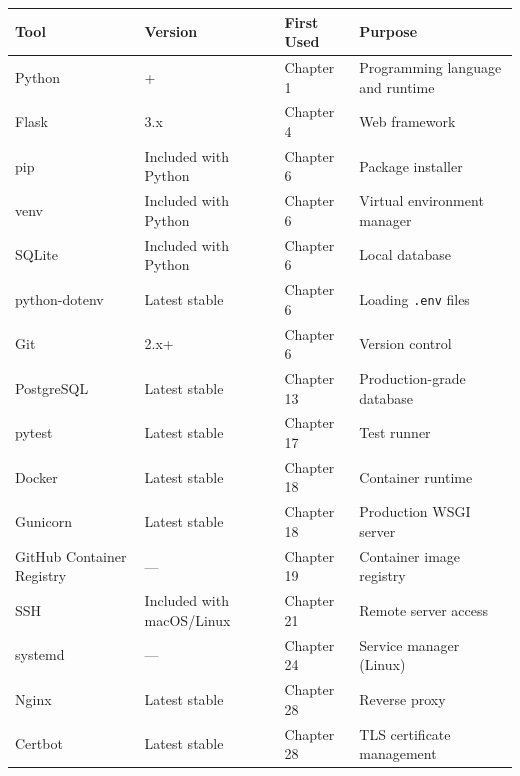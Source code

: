 {\def\LTcaptype{none} %
\begin{longtable}[]{@{}
  >{\raggedright\arraybackslash}p{}
  >{\raggedright\arraybackslash}p{}
  >{\raggedright\arraybackslash}p{}
  >{\raggedright\arraybackslash}p{}@{}}
\toprule\noalign{}
\begin{minipage}[b]{\linewidth}\raggedright
Tool
\end{minipage} & \begin{minipage}[b]{\linewidth}\raggedright
Version
\end{minipage} & \begin{minipage}[b]{\linewidth}\raggedright
First Used
\end{minipage} & \begin{minipage}[b]{\linewidth}\raggedright
Purpose
\end{minipage} \\
\midrule\noalign{}
\endhead
\bottomrule\noalign{}
\endlastfoot
Python & 3.11+ & Chapter 1 & Programming language and runtime \\
Flask & 3.x & Chapter 4 & Web framework \\
pip & Included with Python & Chapter 6 & Package installer \\
venv & Included with Python & Chapter 6 & Virtual environment manager \\
SQLite & Included with Python & Chapter 6 & Local database \\
python-dotenv & Latest stable & Chapter 6 & Loading \texttt{.env} files \\
Git & 2.x+ & Chapter 6 & Version control \\
PostgreSQL & Latest stable & Chapter 13 & Production-grade database \\
pytest & Latest stable & Chapter 17 & Test runner \\
Docker & Latest stable & Chapter 18 & Container runtime \\
Gunicorn & Latest stable & Chapter 18 & Production WSGI server \\
GitHub Container Registry & --- & Chapter 19 & Container image registry \\
SSH & Included with macOS/Linux & Chapter 21 & Remote server access \\
systemd & --- & Chapter 24 & Service manager (Linux) \\
Nginx & Latest stable & Chapter 28 & Reverse proxy \\
Certbot & Latest stable & Chapter 28 & TLS certificate management \\
\end{longtable}
}

